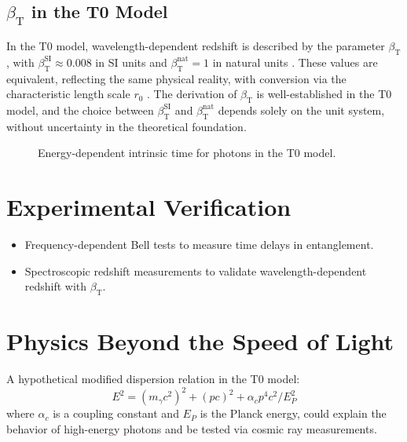 \documentclass[12pt,a4paper]{article}
\newcommand{\betaT}{\beta_{\text{T}}}
\begin{document}
	\subsection{\(\betaT\) in the T0 Model}
	In the T0 model, wavelength-dependent redshift is described by the parameter \(\betaT\), with \(\betaT^{\text{SI}} \approx 0.008\) in SI units and \(\betaT^{\text{nat}} = 1\) in natural units \cite{pascher_params_2025}. These values are equivalent, reflecting the same physical reality, with conversion via the characteristic length scale \(r_0\) \cite{pascher_temp_2025}. The derivation of \(\betaT\) is well-established in the T0 model, and the choice between \(\betaT^{\text{SI}}\) and \(\betaT^{\text{nat}}\) depends solely on the unit system, without uncertainty in the theoretical foundation.
	
	\begin{figure}[h]
		\centering
		\caption{Energy-dependent intrinsic time for photons in the T0 model.}
	\end{figure}
	
	\section{Experimental Verification}
	\begin{itemize}
		\item Frequency-dependent Bell tests to measure time delays in entanglement.
		\item Spectroscopic redshift measurements to validate wavelength-dependent redshift with \(\betaT\).
	\end{itemize}
	
	\section{Physics Beyond the Speed of Light}
	A hypothetical modified dispersion relation in the T0 model:
	\begin{equation}
		E^2 = (m_\gamma c^2)^2 + (p c)^2 + \alpha_c p^4 c^2 / E_P^2
	\end{equation}
	where \(\alpha_c\) is a coupling constant and \(E_P\) is the Planck energy, could explain the behavior of high-energy photons and be tested via cosmic ray measurements.
	
\end{document}
